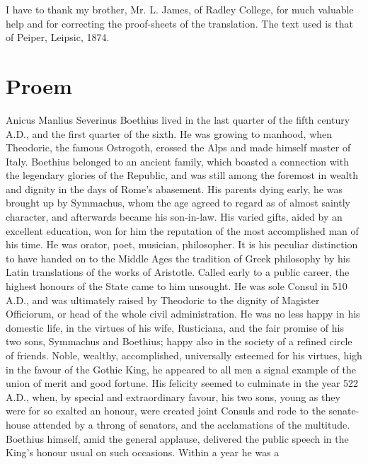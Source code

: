 \documentclass[11pt]{book}
\begin{document}
I have to thank my brother, Mr. L. James, of Radley College, for much
valuable help and for correcting the proof-sheets of the translation.
The text used is that of Peiper, Leipsic, 1874.

\hspace{0pt}
\vfill


\chapter{Proem}

Anicus Manlius Severinus Boethius lived in the last quarter of the fifth
century A.D., and the first quarter of the sixth. He was growing to
manhood, when Theodoric, the famous Ostrogoth, crossed the Alps and made
himself master of Italy. Boethius belonged to an ancient family, which
boasted a connection with the legendary glories of the Republic, and was
still among the foremost in wealth and dignity in the days of Rome's
abasement. His parents dying early, he was brought up by Symmachus, whom
the age agreed to regard as of almost saintly character, and afterwards
became his son-in-law. His varied gifts, aided by an excellent
education, won for him the reputation of the most accomplished man of
his time. He was orator, poet, musician, philosopher. It is his peculiar
distinction to have handed on to the Middle Ages the tradition of Greek
philosophy by his Latin translations of the works of Aristotle. Called
early to a public career, the highest honours of the State came to him
unsought. He was sole Consul in 510 A.D., and was ultimately raised by
Theodoric to the dignity of Magister Officiorum, or head of the whole
civil administration. He was no less happy in his domestic life, in the
virtues of his wife, Rusticiana, and the fair promise of his two sons,
Symmachus and Boethius; happy also in the society of a refined circle of
friends. Noble, wealthy, accomplished, universally esteemed for his
virtues, high in the favour of the Gothic King, he appeared to all men a
signal example of the union of merit and good fortune. His felicity
seemed to culminate in the year 522 A.D., when, by special and
extraordinary favour, his two sons, young as they were for so exalted an
honour, were created joint Consuls and rode to the senate-house
attended by a throng of senators, and the acclamations of the multitude.
Boethius himself, amid the general applause, delivered the public speech
in the King's honour usual on such occasions. Within a year he was a
\end{document}
